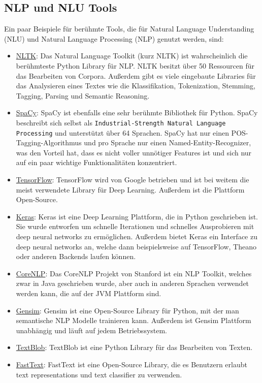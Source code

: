 \subsection{NLP und NLU Tools}\label{subsec:NLP-NLU-Tools}

Ein paar Beispiele für berühmte Tools, die für Natural Language Understanding (NLU) und Natural Language Processing (NLP) genutzt werden, sind:

\begin{itemize}
    \item \href{https://www.nltk.org/}{NLTK}: Das Natural Language Toolkit (kurz NLTK) ist wahrscheinlich die berühmteste Python Library für NLP. NLTK besitzt über 50 Ressourcen für das Bearbeiten von Corpora.
    Außerdem gibt es viele eingebaute Libraries für das Analysieren eines Textes wie die Klassifikation, Tokenization, Stemming, Tagging, Parsing und Semantic Reasoning.
    \item \href{https://spacy.io/}{SpaCy}: SpaCy ist ebenfalls eine sehr berühmte Bibliothek für Python.
    SpaCy beschreibt sich selbst als \texttt{Industrial-Strength Natural Language Processing} und unterstützt über 64 Sprachen.
    SpaCy hat nur einen POS-Tagging-Algorithmus und pro Sprache nur einen Named-Entity-Recognizer, was den Vorteil hat, dass es nicht voller unnötiger Features ist und sich nur auf ein paar wichtige Funktionalitäten konzentriert.
    \item \href{https://www.tensorflow.org/}{TensorFlow}: TensorFlow wird von Google betrieben und ist bei weitem die meist verwendete Library für Deep Learning.
    Außerdem ist die Plattform Open-Source.
    \item \href{https://keras.io/}{Keras}: Keras ist eine Deep Learning Plattform, die in Python geschrieben ist.
    Sie wurde entworfen um schnelle Iterationen und schnelles Ausprobieren mit deep neural networks zu ermöglichen.
    Außerdem bietet Keras ein Interface zu deep neural networks an, welche dann beispielsweise auf TensorFlow, Theano oder anderen Backends laufen können.
    \item \href{https://stanfordnlp.github.io/CoreNLP/}{CoreNLP}: Das CoreNLP Projekt von Stanford ist ein NLP Toolkit, welches zwar in Java geschrieben wurde, aber auch in anderen Sprachen verwendet werden kann, die auf der JVM Plattform sind.
    \item \href{https://radimrehurek.com/gensim/}{Gensim}: Gensim ist eine Open-Source Library für Python, mit der man semantische NLP Modelle trainieren kann.
    Außerdem ist Gensim Plattform unabhängig und läuft auf jedem Betriebssystem.
    \item \href{https://textblob.readthedocs.io/en/dev/}{TextBlob}: TextBlob ist eine Python Library für das Bearbeiten von Texten.
    \item \href{https://fasttext.cc/}{FastText}: FastText ist eine Open-Source Library, die es Benutzern erlaubt text representations und text classifier zu verwenden.
\end{itemize}


